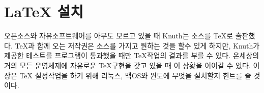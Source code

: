 \appendix
\chapter{\LaTeX{} 설치}
\begin{intro}
오픈소스와 자유소프트웨어를 아무도 모르고 있을 때 Knuth는 소스를 \TeX{}로  출판했다.
\TeX{}과 함께 오는 저작권은 소스를 가지고 원하는 것을 할수 있게 하지만,
Knuth가 제공한 테스트를 프로그램이 통과했을 때만 \TeX{}작업의 결과를 부를 수 있다.
온세상의 거의 모든 운영체제에 자유로운 \TeX{}구현을 갖고 있을 때 이 상황을 이어갈 수 있다.
이 장은 \TeX{} 설정작업을 하기 위해 리눅스, 맥OS와 윈도에 무엇을 설치할지 힌트를 줄 것이다.
\end{intro}

